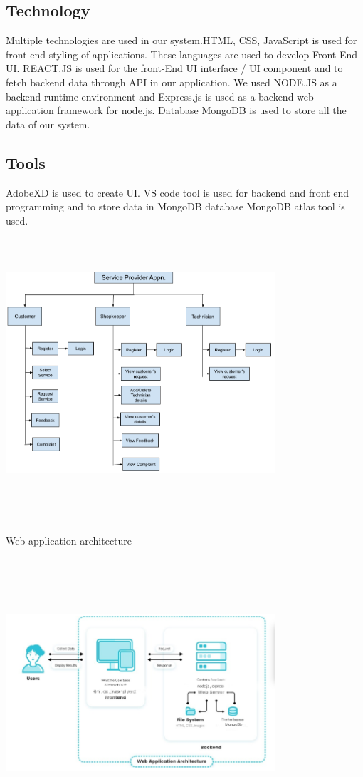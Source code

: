 \documentclass[conference]{IEEEtran}
\begin{document}
\subsection{Technology}
Multiple technologies are used in our system.HTML, CSS,
JavaScript is used for front-end styling of applications. These
languages are used to develop Front End UI. REACT.JS is
used for the front-End UI interface / UI component and to
fetch backend data through API in our application. We used
NODE.JS as a backend runtime environment and
Express.js is used as a backend web application framework
for node.js. Database MongoDB is used to store all the data
of our system.

\subsection{Tools}
AdobeXD is used to create UI. VS code tool is used for
backend and front end programming and to store data in
MongoDB database MongoDB atlas tool is used.
\graphicspath{ {./design/} }
\includegraphics[width=10cm, height=10cm]{design}

\\Web application architecture
\graphicspath{ {./architecture/} }
\includegraphics[width=10cm , height=10cm]{architecture}
\end{document}
